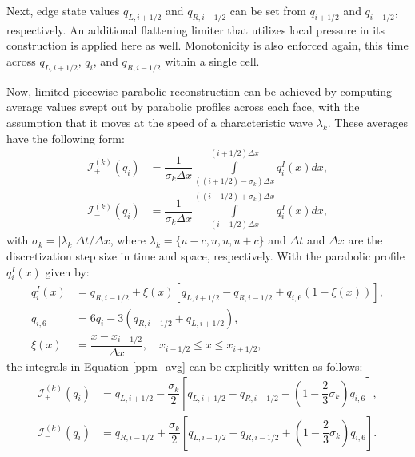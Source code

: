 Next, edge state values $q_{L, i+1/2}$ and $q_{R, i-1/2}$ can be set from $q_{i+1/2}$ and $q_{i-1/2}$, respectively. An additional flattening limiter that utilizes local pressure in its construction is applied here as well. Monotonicity is also enforced again, this time across $q_{L, i+1/2}$, $q_i$, and $q_{R, i-1/2}$ within a single cell. 

Now, limited piecewise parabolic reconstruction can be achieved by computing average values swept out by parabolic profiles across each face, with the assumption that it moves at the speed of a characteristic wave $\lambda_k$. These averages have the following form:
\begin{equation} \label{ppm_avg}
\begin{split}
\mathcal{I}_+^{(k)}(q_i) &= \dfrac{1}{\sigma_k \Delta x} \int\limits_{((i+1/2 )-\sigma_k)\Delta x}^{(i+1/2)\Delta x} q_i^I(x) dx, \\
\mathcal{I}_-^{(k)}(q_i) &= \dfrac{1}{\sigma_k \Delta x} \int\limits^{((i-1/2 )+\sigma_k)\Delta x}_{(i-1/2)\Delta x} q_i^I(x) dx,
\end{split}
\end{equation}
with $\sigma_k = |\lambda_k |\Delta t/\Delta x$, where $\lambda_k = \{u-c, u, u, u+c\}$ and $\Delta t$ and $\Delta x$ are the discretization step size in time and space, respectively. With the parabolic profile $q_i^I(x)$ given by:
\begin{equation}
\begin{split}
q_i^I(x) &= q_{R,i-1/2} + \xi(x) \left[ q_{L, i+1/2} - q_{R, i-1/2} + q_{i,6}\left( 1 - \xi(x) \right) \right], \\
q_{i,6} &= 6q_i - 3 \left( q_{R, i-1/2} + q_{L,i+1/2}\right), \\
\xi(x) &= \dfrac{x - x_{i-1/2}}{\Delta x}, \quad x_{i-1/2} \leq x \leq x_{i+1/2},
\end{split}
\end{equation}
the integrals in Equation \eqref{ppm_avg} can be explicitly written as follows:
\begin{equation}
\begin{split}
\mathcal{I}_+^{(k)}(q_i) &= q_{L, i+1/2} - \dfrac{\sigma_k}{2} \left[ q_{L,i+1/2} - q_{R,i-1/2} - \left( 1 - \dfrac{2}{3}\sigma_k \right)q_{i,6} \right], \\
\mathcal{I}_-^{(k)}(q_i) &= q_{R, i-1/2} + \dfrac{\sigma_k}{2} \left[ q_{L,i+1/2} - q_{R,i-1/2} + \left( 1 - \dfrac{2}{3}\sigma_k \right)q_{i,6} \right]. 
\end{split}
\end{equation}

